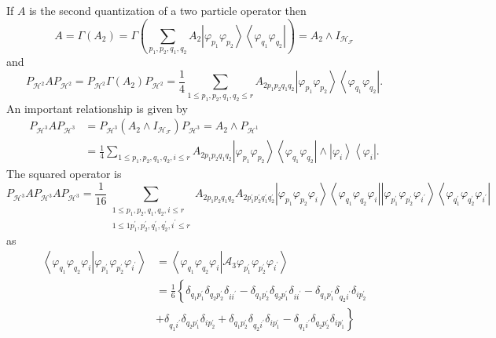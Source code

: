 \documentclass[aps,preprint]{revtex4}%
\begin{document}
If $A$ is the second quantization of a two particle operator then
\begin{equation}
A=\Gamma\left(  A_{2}\right)  =\Gamma\left(  \sum_{p_{1},p_{2},q_{1},q_{2}%
}A_{2}\left\vert \varphi_{p_{1}}\varphi_{p_{2}}\right\rangle \left\langle
\varphi_{q_{1}}\varphi_{q_{2}}\right\vert \right)  =A_{2}\wedge I_{\mathcal{H}%
_{\mathcal{F}}}\nonumber
\end{equation}
and
\begin{equation}
P_{\mathcal{H}^{2}}AP_{\mathcal{H}^{2}}=P_{\mathcal{H}^{2}}\Gamma\left(
A_{2}\right)  P_{\mathcal{H}^{2}}=\frac{1}{4}\sum_{1\leq p_{1},p_{2}%
,q_{1},q_{2}\leq r}A_{2p_{1}p_{2}q_{1}q_{2}}\left\vert \varphi_{p_{1}}%
\varphi_{p_{2}}\right\rangle \left\langle \varphi_{q_{1}}\varphi_{q_{2}%
}\right\vert .
\end{equation}
An important relationship is given by
\begin{align}
P_{\mathcal{H}^{3}}AP_{\mathcal{H}^{3}}  &  =P_{\mathcal{H}^{3}}\left(
A_{2}\wedge I_{\mathcal{H}_{\mathcal{F}}}\right)  P_{\mathcal{H}^{3}}%
=A_{2}\wedge P_{\mathcal{H}^{1}}\nonumber\\
&  =\frac{1}{4}\sum_{1\leq p_{1},p_{2},q_{1},q_{2},i\leq r}A_{2p_{1}p_{2}%
q_{1}q_{2}}\left\vert \varphi_{p_{1}}\varphi_{p_{2}}\right\rangle \left\langle
\varphi_{q_{1}}\varphi_{q_{2}}\right\vert \wedge\left\vert \varphi
_{i}\right\rangle \left\langle \varphi_{i}\right\vert .
\end{align}
The squared operator is
\begin{equation}
P_{\mathcal{H}^{3}}AP_{\mathcal{H}^{3}}AP_{\mathcal{H}^{3}}=\frac{1}{16}%
\sum_{\substack{1\leq p_{1},p_{2},q_{1},q_{2},i\leq r\\1\leq1p_{1}^{\prime
},p_{2}^{\prime},q_{1}^{\prime},q_{2}^{\prime},i^{\prime}\leq r}%
}A_{2p_{1}p_{2}q_{1}q_{2}}A_{2p_{1}^{\prime}p_{2}^{\prime}q_{1}^{\prime}%
q_{2}^{\prime}}\left\vert \varphi_{p_{1}}\varphi_{p_{2}}\varphi_{i}%
\right\rangle \left\langle \varphi_{q_{1}}\varphi_{q_{2}}\varphi
_{i}\right\vert \left\vert \varphi_{p_{1}^{\prime}}\varphi_{p_{2}^{\prime}%
}\varphi_{i^{\prime}}\right\rangle \left\langle \varphi_{q_{1}^{\prime}%
}\varphi_{q_{2}^{\prime}}\varphi_{i^{\prime}}\right\vert
\end{equation}
as
\begin{align}
\left\langle \varphi_{q_{1}}\varphi_{q_{2}}\varphi_{i}\left\vert
\varphi_{p_{1}^{\prime}}\varphi_{p_{2}^{\prime}}\varphi_{i^{\prime}}\right.
\right\rangle  &  =\left\langle \varphi_{q_{1}}\varphi_{q_{2}}\varphi
_{i}\left\vert \mathcal{A}_{3}\varphi_{p_{1}^{\prime}}\varphi_{p_{2}^{\prime}%
}\varphi_{i^{\prime}}\right.  \right\rangle \nonumber\\
&  =\frac{1}{6}\left\{  \delta_{q_{1}p_{1}^{\prime}}\delta_{q_{2}p_{2}%
^{\prime}}\delta_{ii^{\prime}}-\delta_{q_{1}p_{2}^{\prime}}\delta_{q_{2}%
p_{1}^{\prime}}\delta_{ii^{\prime}}-\delta_{q_{1}p_{1}^{\prime}}\delta
_{q_{2}i^{\prime}}\delta_{ip_{2}^{\prime}}\right. \nonumber\\
&  +\left.  \delta_{q_{1}i^{\prime}}\delta_{q_{2}p_{1}^{\prime}}\delta
_{ip_{2}^{\prime}}+\delta_{q_{1}p_{2}^{\prime}}\delta_{q_{2}i^{\prime}}%
\delta_{ip_{1}^{\prime}}-\delta_{q_{1}i^{\prime}}\delta_{q_{2}p_{2}^{\prime}%
}\delta_{ip_{1}^{\prime}}\right\}
\end{align}
\end{document}
